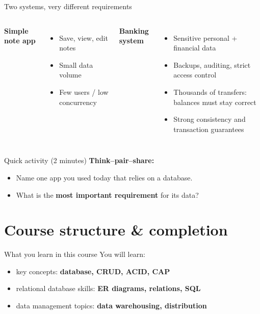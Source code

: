 \documentclass[10pt,aspectratio=169]{beamer}
\begin{document}
\begin{frame}{Two systems, very different requirements}
\begin{columns}[T,onlytextwidth]
\textbf{Simple note app}
\begin{itemize}
  \item Save, view, edit notes
  \item Small data volume
  \item Few users / low concurrency
\end{itemize}

\textbf{Banking system}
\begin{itemize}
  \item Sensitive personal + financial data
  \item Backups, auditing, strict access control
  \item Thousands of transfers: balances must stay correct
  \item Strong consistency and transaction guarantees
\end{itemize}
\end{columns}
\end{frame}

\begin{frame}{Quick activity (2 minutes)}
\textbf{Think--pair--share:}
\begin{itemize}
  \item Name one app you used today that relies on a database.
  \item What is the \textbf{most important requirement} for its data?
\end{itemize}
\end{frame}

\section{Course structure \& completion}

\begin{frame}{What you learn in this course}
You will learn:
\begin{itemize}
  \item key concepts: \textbf{database, CRUD, ACID, CAP}
  \item relational database skills: \textbf{ER diagrams, relations, SQL}
  \item data management topics: \textbf{data warehousing, distribution}
\end{itemize}
\end{frame}
\end{document}
